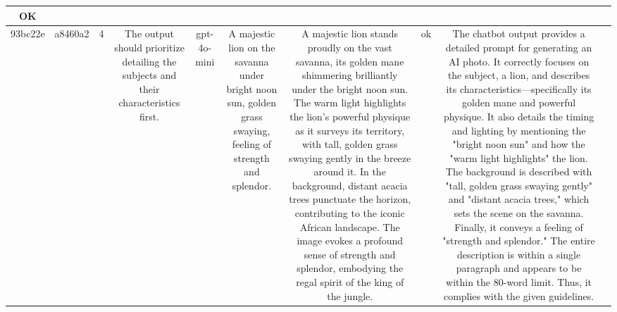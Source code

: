\begin{table}[h!]
\begin{tabular}{|c|c|c|c|c|c|c|c|c|c|}
OK & \\
\hline
93bc22e & a8460a2 & 4 & The output should prioritize detailing the subjects and their characteristics first. & gpt-4o-mini & A majestic lion on the savanna under bright noon sun, golden grass swaying, feeling of strength and splendor. & A majestic lion stands proudly on the vast savanna, its golden mane shimmering brilliantly under the bright noon sun. The warm light highlights the lion's powerful physique as it surveys its territory, with tall, golden grass swaying gently in the breeze around it. In the background, distant acacia trees punctuate the horizon, contributing to the iconic African landscape. The image evokes a profound sense of strength and splendor, embodying the regal spirit of the king of the jungle. & ok & The chatbot output provides a detailed prompt for generating an AI photo. It correctly focuses on the subject, a lion, and describes its characteristics—specifically its golden mane and powerful physique. It also details the timing and lighting by mentioning the "bright noon sun" and how the "warm light highlights" the lion. The background is described with "tall, golden grass swaying gently" and "distant acacia trees," which sets the scene on the savanna. Finally, it conveys a feeling of "strength and splendor." The entire description is within a single paragraph and appears to be within the 80-word limit. Thus, it complies with the given guidelines.


\end{tabular}
\end{table}
